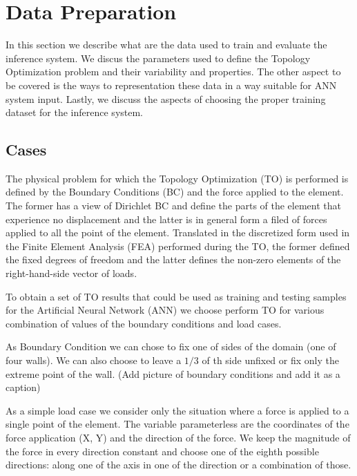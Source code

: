 


\section{Data Preparation}

In this section we describe what are the data used to train and evaluate the inference system.
We discus the parameters used to define the Topology Optimization problem and their variability and properties.
The other aspect to be covered is the ways to representation these data in a way suitable for ANN system input.
Lastly, we discuss the aspects of choosing the proper training dataset for the inference system.

\subsection{Cases}

The physical problem for which the Topology Optimization (TO) is performed is defined by the Boundary Conditions (BC) and the force applied to the element. 
The former has a view of Dirichlet BC and define the parts of the element that experience no displacement and the latter is in general form a filed of forces applied to all the point of the element. 
Translated in the discretized form used in the Finite Element Analysis (FEA) performed during the TO, the former defined the fixed degrees of freedom and the latter defines the non-zero elements of the right-hand-side vector of loads.
\medskip

To obtain a set of TO results that could be used as training and testing samples for the Artificial Neural Network (ANN) we choose perform TO for various combination of values of the boundary conditions and load cases.
\medskip

As Boundary Condition we can chose to fix one of sides of the domain (one of four walls). 
We can also choose to leave a ${1/3}$ of th side unfixed or fix only the extreme point of the wall. (Add picture of boundary conditions and add it as a caption)
\medskip

As a simple load case we consider only the situation where a force is applied to a single point of the element. 
The variable parameterless are the coordinates of the force application (X, Y) and the direction of the force.
We keep the magnitude of the force in every direction constant and choose one of the eighth possible directions: along one of the axis in one of the direction or a combination of those.
\medskip

